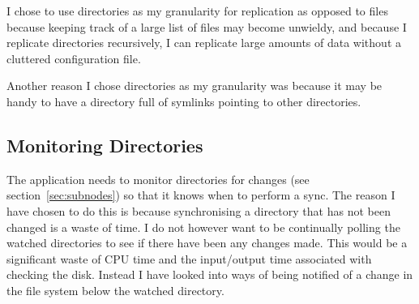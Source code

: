 \documentclass[12pt]{article}
\begin{document}
I chose to use directories as my granularity for replication
as opposed to files because keeping track of a large list
of files may become unwieldy,
and because I replicate
directories recursively, I can replicate large amounts
of data without a cluttered configuration file.

Another reason I chose directories as my granularity was because it may be
handy to have a directory full of symlinks pointing to other directories.

\subsection{Monitoring Directories}
The application needs to monitor directories for changes
(see section~\ref{sec:subnodes})
so that it knows when to perform a sync. The reason I have
chosen to do this is because synchronising a directory that
has not been changed is a waste of time. I do not
however want to be continually polling the watched
directories to see if there have been any changes made.
This would be a significant waste of CPU time and the input/output
time associated with checking the disk. Instead
I have looked into ways of being notified of a
change in the file system below the watched directory.
\end{document}
